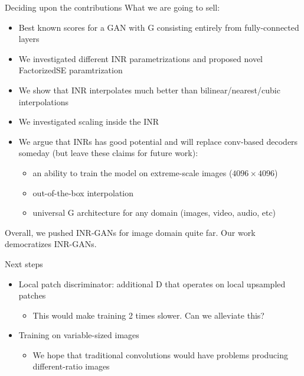 \documentclass[10pt, handout]{beamer}
\begin{document}
\begin{frame}{Deciding upon the contributions}
What we are going to sell:
\begin{itemize}
    \item\pause Best known scores for a GAN with G consisting entirely from fully-connected layers
    \item\pause We investigated different INR parametrizations and proposed novel FactorizedSE paramtrization
    \item\pause We show that INR interpolates much better than bilinear/nearest/cubic interpolations
    \item\pause We investigated scaling inside the INR
    \item\pause We argue that INRs has good potential and will replace conv-based decoders someday (but leave these claims for future work):
    \begin{itemize}
        \item\pause an ability to train the model on extreme-scale images ($4096 \times 4096$)
        \item\pause out-of-the-box interpolation
        \item\pause universal G architecture for any domain (images, video, audio, etc)
    \end{itemize}
\end{itemize}

Overall, we pushed INR-GANs for image domain quite far.
Our work democratizes INR-GANs.
\end{frame}


\begin{frame}{Next steps}
\begin{itemize}
    \item\pause Local patch discriminator: additional D that operates on local upsampled patches
    \begin{itemize}
        \item\pause This would make training 2 times slower. Can we alleviate this?
    \end{itemize}
    \item\pause Training on variable-sized images
    \begin{itemize}
        \item\pause We hope that traditional convolutions would have problems producing different-ratio images
    \end{itemize}
\end{itemize}
\end{frame}
\end{document}

